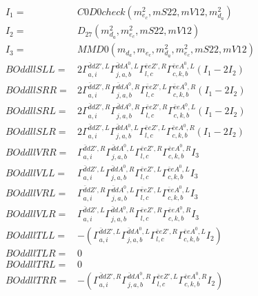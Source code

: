 \documentclass[A4,landscape]{article}
\begin{document}
\begin{align} 
I_1 = & C0D0check(m^2_{e_{{c}}}, mS22, mV12, m^2_{d_{{a}}}) \\ 
I_2 = & D_{27}(m^2_{d_{{a}}}, m^2_{e_{{c}}}, mS22, mV12) \\ 
I_3 = & MMD0(m_{d_{{a}}}, m_{e_{{c}}}, m^2_{d_{{a}}}, m^2_{e_{{c}}}, mS22, mV12) \\ 
  BOddllSLL= & 2  \Gamma^{\bar{d}d {Z'} ,L}_{a, i} \Gamma^{\bar{d}d A^0 ,L}_{j, a, b} \Gamma^{\bar{e}e {Z'} ,R}_{l, c} \Gamma^{\bar{e}e A^0 ,L}_{c, k, b} (I_1 - 2 I_2) \\ 
  BOddllSRR= & 2  \Gamma^{\bar{d}d {Z'} ,R}_{a, i} \Gamma^{\bar{d}d A^0 ,R}_{j, a, b} \Gamma^{\bar{e}e {Z'} ,L}_{l, c} \Gamma^{\bar{e}e A^0 ,R}_{c, k, b} (I_1 - 2 I_2) \\ 
  BOddllSRL= & 2  \Gamma^{\bar{d}d {Z'} ,R}_{a, i} \Gamma^{\bar{d}d A^0 ,R}_{j, a, b} \Gamma^{\bar{e}e {Z'} ,R}_{l, c} \Gamma^{\bar{e}e A^0 ,L}_{c, k, b} (I_1 - 2 I_2) \\ 
  BOddllSLR= & 2  \Gamma^{\bar{d}d {Z'} ,L}_{a, i} \Gamma^{\bar{d}d A^0 ,L}_{j, a, b} \Gamma^{\bar{e}e {Z'} ,L}_{l, c} \Gamma^{\bar{e}e A^0 ,R}_{c, k, b} (I_1 - 2 I_2) \\ 
  BOddllVRR= &  \Gamma^{\bar{d}d {Z'} ,R}_{a, i} \Gamma^{\bar{d}d A^0 ,L}_{j, a, b} \Gamma^{\bar{e}e {Z'} ,R}_{l, c} \Gamma^{\bar{e}e A^0 ,R}_{c, k, b} I_3 \\ 
  BOddllVLL= &  \Gamma^{\bar{d}d {Z'} ,L}_{a, i} \Gamma^{\bar{d}d A^0 ,R}_{j, a, b} \Gamma^{\bar{e}e {Z'} ,L}_{l, c} \Gamma^{\bar{e}e A^0 ,L}_{c, k, b} I_3 \\ 
  BOddllVRL= &  \Gamma^{\bar{d}d {Z'} ,R}_{a, i} \Gamma^{\bar{d}d A^0 ,L}_{j, a, b} \Gamma^{\bar{e}e {Z'} ,L}_{l, c} \Gamma^{\bar{e}e A^0 ,L}_{c, k, b} I_3 \\ 
  BOddllVLR= &  \Gamma^{\bar{d}d {Z'} ,L}_{a, i} \Gamma^{\bar{d}d A^0 ,R}_{j, a, b} \Gamma^{\bar{e}e {Z'} ,R}_{l, c} \Gamma^{\bar{e}e A^0 ,R}_{c, k, b} I_3 \\ 
  BOddllTLL= & -( \Gamma^{\bar{d}d {Z'} ,L}_{a, i} \Gamma^{\bar{d}d A^0 ,L}_{j, a, b} \Gamma^{\bar{e}e {Z'} ,R}_{l, c} \Gamma^{\bar{e}e A^0 ,L}_{c, k, b} I_2) \\ 
  BOddllTLR= & 0 \\ 
  BOddllTRL= & 0 \\ 
  BOddllTRR= & -( \Gamma^{\bar{d}d {Z'} ,R}_{a, i} \Gamma^{\bar{d}d A^0 ,R}_{j, a, b} \Gamma^{\bar{e}e {Z'} ,L}_{l, c} \Gamma^{\bar{e}e A^0 ,R}_{c, k, b} I_2) \\ 
\end{align} 
\end{document}
